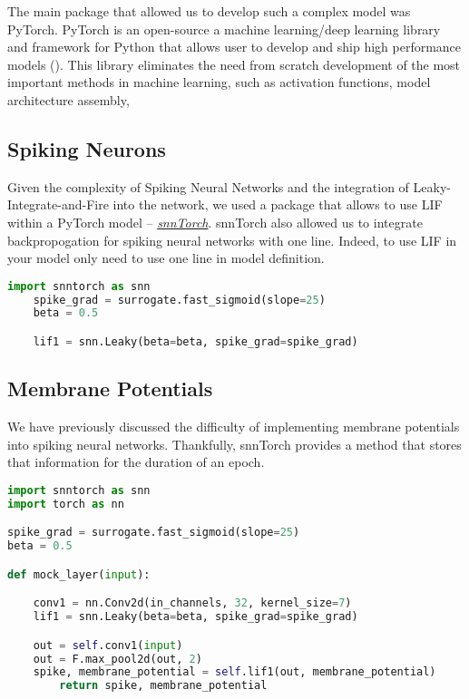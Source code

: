 The main package that allowed us to develop such a complex model was PyTorch. PyTorch
is an open-source a machine learning/deep learning library and framework for Python 
that allows user to develop and ship high performance models (). This library
eliminates the need from scratch development of the most important methods in machine learning,
such as activation functions, model architecture assembly, 


\subsection{Spiking Neurons}

Given the complexity of Spiking Neural Networks and the integration of Leaky-Integrate-and-Fire
into the network, we used a package that allows to use LIF within a PyTorch model -- 
\href{https://snntorch.readthedocs.io/en/latest/snntorch.html}{\textit{snnTorch}}. 
snnTorch also allowed us to integrate backpropogation for spiking neural networks
with one line. Indeed, to use LIF in your model only need to use one line in model
definition.

\begin{lstlisting}[language=Python, caption=Leaky-Integrate-and-Fire using snnTorch]
	import snntorch as snn
	spike_grad = surrogate.fast_sigmoid(slope=25)
	beta = 0.5

	lif1 = snn.Leaky(beta=beta, spike_grad=spike_grad)

\end{lstlisting}

\subsection{Membrane Potentials}

We have previously discussed the difficulty of implementing membrane potentials into spiking neural networks. Thankfully, snnTorch provides a method that stores that information for the duration of an epoch.

\begin{lstlisting}[language=Python, caption=snnTorch Implementation of Membrane Potentials]
import snntorch as snn
import torch as nn

spike_grad = surrogate.fast_sigmoid(slope=25)
beta = 0.5

def mock_layer(input):

    conv1 = nn.Conv2d(in_channels, 32, kernel_size=7)
    lif1 = snn.Leaky(beta=beta, spike_grad=spike_grad)

    out = self.conv1(input)
    out = F.max_pool2d(out, 2)
    spike, membrane_potential = self.lif1(out, membrane_potential)
		return spike, membrane_potential

\end{lstlisting}


